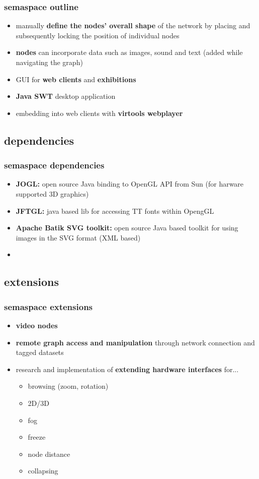 \documentclass[blue]{beamer}
\begin{document}
\frame
{
\frametitle{\textbf{semaspace outline}}
\begin{itemize}
	\item manually \textbf{define the nodes' overall shape} of the network by placing and subsequently locking the position of individual nodes
	\item \textbf{nodes} can incorporate data such as images, sound and text (added while navigating the graph)
	\item GUI for \textbf{web clients} and \textbf{exhibitions}
	\item \textbf{Java SWT} desktop application
	\item embedding into web clients with \textbf{virtools webplayer}
\end{itemize}
}

\subsection{dependencies}
\frame
{
\frametitle{\textbf{semaspace dependencies}}
\begin{itemize}
	\item \textbf{JOGL:} open source Java binding to OpenGL API from Sun (for harware supported 3D graphics)
	\item \textbf{JFTGL:} java based lib for accessing TT fonts within OpengGL
	\item \textbf{Apache Batik SVG toolkit:} open source Java based toolkit for using images in the SVG format (XML based)
	\item \textbf{}
\end{itemize}
}


\subsection{extensions}
\frame
{
\frametitle{\textbf{semaspace extensions}}
\begin{itemize}
	\item \textbf{video nodes}
	\item \textbf{remote graph access and manipulation} through network connection and tagged datasets
	\item research and implementation of \textbf{extending hardware interfaces} for...
		\begin{itemize}[<+-|alert@+>]
			\item browsing (zoom, rotation)
			\item 2D/3D
			\item fog
			\item freeze
			\item node distance
			\item collapsing
		\end{itemize}
\end{itemize}
}
\end{document}
